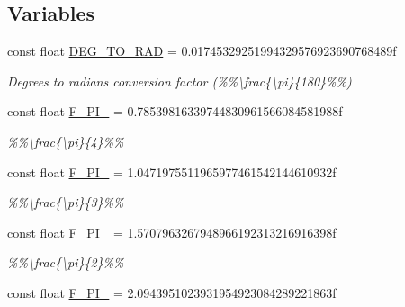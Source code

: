 \subsection*{Variables}
\begin{DoxyCompactItemize}
\item 
\hypertarget{group___scalar_math_consts_ga12f80781f7eb3697d59ab8a1ed1a4cf3}{}const float \hyperlink{group___scalar_math_consts_ga12f80781f7eb3697d59ab8a1ed1a4cf3}{D\+E\+G\+\_\+\+T\+O\+\_\+\+R\+A\+D} = 0.\+01745329251994329576923690768489f\label{group___scalar_math_consts_ga12f80781f7eb3697d59ab8a1ed1a4cf3}

\begin{DoxyCompactList}\small\item\em Degrees to radians conversion factor (\%\%\textbackslash{}frac\{\textbackslash{}pi\}\{180\}\%\%) \end{DoxyCompactList}\item 
\hypertarget{group___scalar_math_consts_ga64a9a19137bce5d9eb22c3e5ef7766ed}{}const float \hyperlink{group___scalar_math_consts_ga64a9a19137bce5d9eb22c3e5ef7766ed}{F\+\_\+\+P\+I\+\_} = 0.\+78539816339744830961566084581988f\label{group___scalar_math_consts_ga64a9a19137bce5d9eb22c3e5ef7766ed}

\begin{DoxyCompactList}\small\item\em \%\%\textbackslash{}frac\{\textbackslash{}pi\}\{4\}\%\% \end{DoxyCompactList}\item 
\hypertarget{group___scalar_math_consts_gac7dedc26e0695833bd1aa3a17dd257c5}{}const float \hyperlink{group___scalar_math_consts_gac7dedc26e0695833bd1aa3a17dd257c5}{F\+\_\+\+P\+I\+\_} = 1.\+0471975511965977461542144610932f\label{group___scalar_math_consts_gac7dedc26e0695833bd1aa3a17dd257c5}

\begin{DoxyCompactList}\small\item\em \%\%\textbackslash{}frac\{\textbackslash{}pi\}\{3\}\%\% \end{DoxyCompactList}\item 
\hypertarget{group___scalar_math_consts_ga946e6dc7aaa53bbc0d3b6d433891c7a8}{}const float \hyperlink{group___scalar_math_consts_ga946e6dc7aaa53bbc0d3b6d433891c7a8}{F\+\_\+\+P\+I\+\_} = 1.\+5707963267948966192313216916398f\label{group___scalar_math_consts_ga946e6dc7aaa53bbc0d3b6d433891c7a8}

\begin{DoxyCompactList}\small\item\em \%\%\textbackslash{}frac\{\textbackslash{}pi\}\{2\}\%\% \end{DoxyCompactList}\item 
\hypertarget{group___scalar_math_consts_gad791e3195a27956d70d1d6912fa386a5}{}const float \hyperlink{group___scalar_math_consts_gad791e3195a27956d70d1d6912fa386a5}{F\+\_\+P\+I\+\_} = 2.\+0943951023931954923084289221863f\label{group___scalar_math_consts_gad791e3195a27956d70d1d6912fa386a5}


\end{DoxyCompactItemize}
